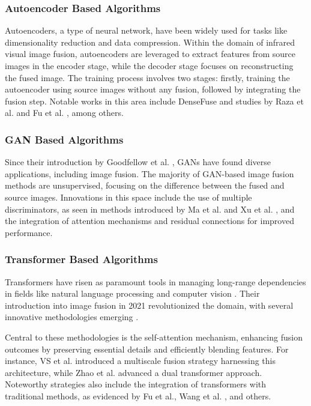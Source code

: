 \subsubsection{Autoencoder Based Algorithms}
Autoencoders, a type of neural network, have been widely used for tasks like dimensionality reduction and data compression. Within the domain of infrared visual image fusion, autoencoders are leveraged to extract features from source images in the encoder stage, while the decoder stage focuses on reconstructing the fused image. The training process involves two stages: firstly, training the autoencoder using source images without any fusion, followed by integrating the fusion step. Notable works in this area include DenseFuse \cite{li2019infrared} and studies by Raza et al. \cite{raza2020pfaf} and Fu et al. \cite{fu2021dual}, among others.

\subsubsection{GAN Based Algorithms}
Since their introduction by Goodfellow et al. \cite{goodfellow2014generative}, GANs have found diverse applications, including image fusion. The majority of GAN-based image fusion methods are unsupervised, focusing on the difference between the fused and source images. Innovations in this space include the use of multiple discriminators, as seen in methods introduced by Ma et al. \cite{ma2020ganmcc} and Xu et al. \cite{xu2019learning}, and the integration of attention mechanisms and residual connections for improved performance.

\subsubsection{Transformer Based Algorithms}
\label{sec:Transformer}

Transformers have risen as paramount tools in managing long-range dependencies in fields like natural language processing and computer vision \cite{dosovitskiy2020image, liu2021swin, liu2022mfst}. Their introduction into image fusion in 2021 revolutionized the domain, with several innovative methodologies emerging \cite{zhao2021dndt, rao2023tgfuse, li2022cgtf, tang2022ydtr, wang2022swinfuse, yang2023dglt, tang2023tccfusion}. 

Central to these methodologies is the self-attention mechanism, enhancing fusion outcomes by preserving essential details and efficiently blending features. For instance, VS et al. \cite{vs2022image} introduced a multiscale fusion strategy harnessing this architecture, while Zhao et al. \cite{zhao2021dndt} advanced a dual transformer approach. Noteworthy strategies also include the integration of transformers with traditional methods, as evidenced by Fu et al.\cite{fu2021ppt}, Wang et al. \cite{wang2022swinfuse}, and others.

